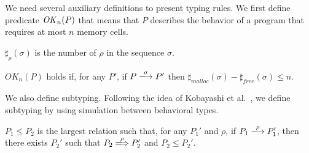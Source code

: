 

We need several auxiliary definitions to present typing rules.  We
first define predicate \(\mathit{OK}_n(P)\) that means that \(P\) describes
the behavior of a program that requires at most \(n\) memory cells.

\begin{myDef}[\(\sharp_{\rho}(\sigma)\)]
 \label{df:sharf}
\(\sharp_{\rho}(\sigma)\) is the number of \(\rho\) in the sequence
\(\sigma\).
\end{myDef}


\begin{myDef}
\label{df:okn}
\(OK_{n}(P)\) holds if, for any \(P'\), if \(P
\xlongrightarrow{\sigma}P'\) then
\(\sharp_{malloc}(\sigma)-\sharp_{free}(\sigma)\le n\).
\end{myDef}

We also define subtyping.  Following the idea of Kobayashi et
al.~\cite{DBLP:journals/tcs/IgarashiK04}, we define subtyping by
using simulation between behavioral types.

 \begin{myDef}[Subtyping]

\(P_1 \le P_2\) is the largest relation such that, for any \(P_1'\)
and \(\rho\), if \(P_1 \xlongrightarrow{\rho} P_1'\), then there
exists \(P_2'\) such that \(P_2 \xLongrightarrow{\rho} P_2'\) and
\(P_2 \le P_2'\).

\label{df:subtype}
\end{myDef}

